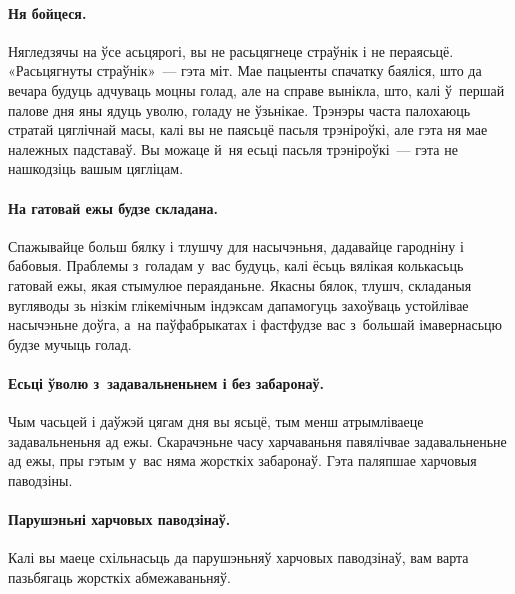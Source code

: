 
\paragraph{Ня бойцеся.}
Нягледзячы на ўсе асьцярогі, вы не расьцягнеце страўнік і не пераясьцё. «Расьцягнуты страўнік»~--- гэта міт. Мае пацыенты спачатку баяліся, што да вечара будуць адчуваць моцны голад, але на справе вынікла, што, калі ў~першай палове дня яны ядуць уволю, голаду не ўзьнікае. Трэнэры часта палохаюць стратай цяглічнай масы, калі вы не паясьцё пасьля трэніроўкі, але гэта ня мае належных падставаў. Вы можаце й~ня есьці пасьля трэніроўкі~--- гэта не нашкодзіць вашым цягліцам.

\paragraph{На гатовай ежы будзе складана.}
Спажывайце больш бялку і тлушчу для насычэньня, дадавайце гародніну і бабовыя. Праблемы з~голадам у~вас будуць, калі ёсьць вялікая колькасьць гатовай ежы, якая стымулюе пераяданьне. Якасны бялок, тлушч, складаныя вугляводы зь нізкім глікемічным індэксам дапамогуць захоўваць устойлівае насычэньне доўга, а~на паўфабрыкатах і фастфудзе вас з~большай імавернасьцю будзе мучыць голад.

\paragraph{Есьці ўволю з~задавальненьнем і без забаронаў.}
Чым часьцей і даўжэй цягам дня вы ясьцё, тым менш атрымліваеце задавальненьня ад ежы. Скарачэньне часу харчаваньня павялічвае задавальненьне ад ежы, пры гэтым у~вас няма жорсткіх забаронаў. Гэта паляпшае харчовыя паводзіны.

\paragraph{Парушэньні харчовых паводзінаў.}
Калі вы маеце схільнасьць да парушэньняў харчовых паводзінаў, вам варта пазьбягаць жорсткіх абмежаваньняў.
